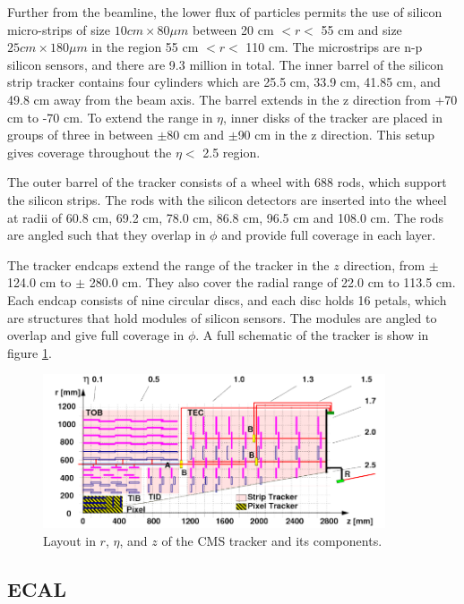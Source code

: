 \documentclass[oneside, letterpaper, oldfontcommands]{memoir}
\begin{document}
\qquad Further from the beamline, the lower flux of particles permits the use of silicon micro-strips of size $10 cm \times 80 \mu m$ between 20 cm $< r < $ 55 cm and size $25 cm \times 180 \mu m$ in the region 55 cm $ < r < $ 110 cm. The microstrips are n-p silicon sensors, and there are 9.3 million in total. The inner barrel of the silicon strip tracker contains four cylinders which are 25.5 cm, 33.9 cm, 41.85 cm, and 49.8 cm away from the beam axis. The barrel extends in the z direction from +70 cm to -70 cm. To extend the range in $\eta$, inner disks of the tracker are placed in groups of three in between $\pm$80 cm and $\pm$90 cm in the z direction. This setup gives coverage throughout the $\eta<$  2.5 region.

\qquad The outer barrel of the tracker consists of a wheel with 688 rods, which support the silicon strips. The rods with the silicon detectors are inserted into the wheel at radii of 60.8 cm, 69.2 cm, 78.0 cm, 86.8 cm, 96.5 cm and 108.0 cm. The rods are angled such that they overlap in $\phi$ and provide full coverage in each layer.

\qquad The tracker endcaps extend the range of the tracker in the $z$ direction, from $\pm$ 124.0 cm to $\pm$ 280.0 cm. They also cover the radial range of 22.0 cm to 113.5 cm. Each endcap consists of nine circular discs, and each disc holds 16 petals, which are structures that hold modules of silicon sensors. The modules are angled to overlap and give full coverage in $\phi$. A full schematic of the tracker is show in figure \ref{fig:cmstracker}.

\begin{figure}[here]
\includegraphics[width=0.9\textwidth]{cmstracker.png}
\caption{Layout in $r$, $\eta$, and $z$ of the CMS tracker and its components.  \cite{Chatrchyan:2014wfa}}
\label{fig:cmstracker}
\end{figure}

\subsection{ECAL}\label{ecal}
\end{document}
